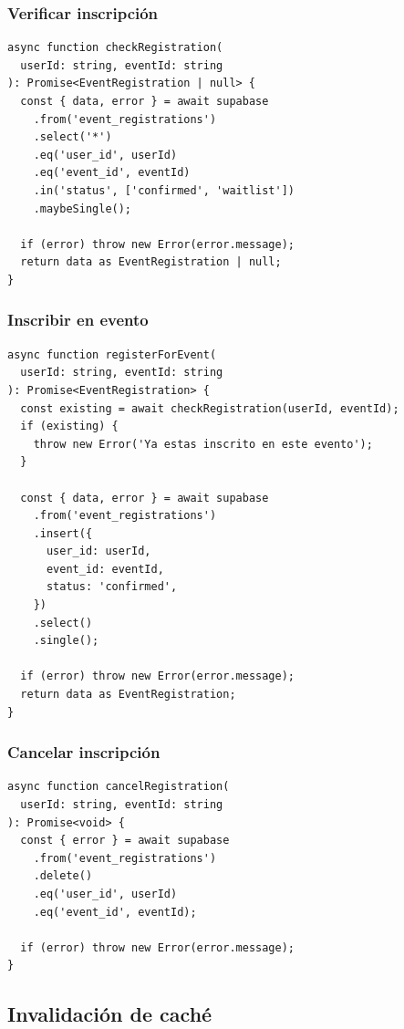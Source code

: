 \documentclass[12pt,letterpaper]{article}
\begin{document}
\subsubsection*{Verificar inscripci\'on}

\begin{verbatim}
async function checkRegistration(
  userId: string, eventId: string
): Promise<EventRegistration | null> {
  const { data, error } = await supabase
    .from('event_registrations')
    .select('*')
    .eq('user_id', userId)
    .eq('event_id', eventId)
    .in('status', ['confirmed', 'waitlist'])
    .maybeSingle();

  if (error) throw new Error(error.message);
  return data as EventRegistration | null;
}
\end{verbatim}

\subsubsection*{Inscribir en evento}

\begin{verbatim}
async function registerForEvent(
  userId: string, eventId: string
): Promise<EventRegistration> {
  const existing = await checkRegistration(userId, eventId);
  if (existing) {
    throw new Error('Ya estas inscrito en este evento');
  }

  const { data, error } = await supabase
    .from('event_registrations')
    .insert({
      user_id: userId,
      event_id: eventId,
      status: 'confirmed',
    })
    .select()
    .single();

  if (error) throw new Error(error.message);
  return data as EventRegistration;
}
\end{verbatim}

\subsubsection*{Cancelar inscripci\'on}

\begin{verbatim}
async function cancelRegistration(
  userId: string, eventId: string
): Promise<void> {
  const { error } = await supabase
    .from('event_registrations')
    .delete()
    .eq('user_id', userId)
    .eq('event_id', eventId);

  if (error) throw new Error(error.message);
}
\end{verbatim}

\subsection{Invalidaci\'on de cach\'e}
\end{document}
